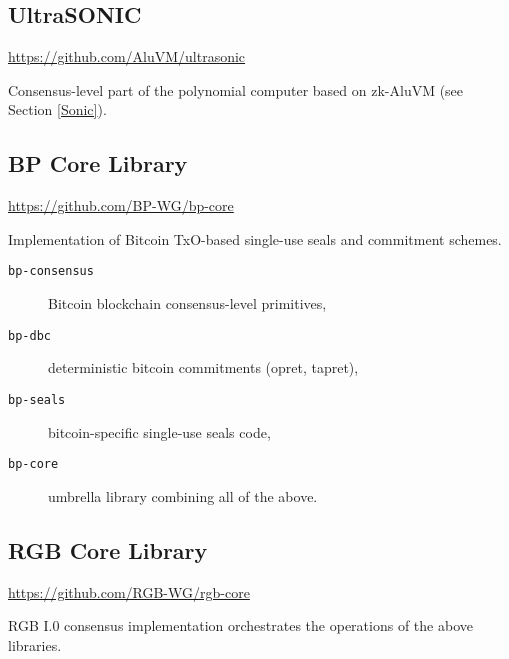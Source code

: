 \documentclass[9pt,oneside]{amsart}
\begin{document}
\subsection{UltraSONIC}

\url{https://github.com/AluVM/ultrasonic}

Consensus-level part of the polynomial computer based on zk-AluVM (see Section \ref{Sonic}).

\subsection{BP Core Library}
    
\url{https://github.com/BP-WG/bp-core}

Implementation of Bitcoin TxO-based single-use seals and commitment schemes.

\begin{description}
    \item[\texttt{bp-consensus}]  Bitcoin blockchain consensus-level primitives,
    \item[\texttt{bp-dbc}] deterministic bitcoin commitments (opret, tapret),
    \item[\texttt{bp-seals}] bitcoin-specific single-use seals code,
    \item[\texttt{bp-core}] umbrella library combining all of the above.
\end{description}

\subsection{RGB Core Library}

\url{https://github.com/RGB-WG/rgb-core}

RGB I.0 consensus implementation orchestrates the operations of the above libraries.


\newpage
\section{}\label{ap:gloss}
\printglossaries
\end{document}
